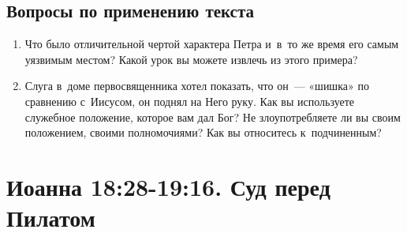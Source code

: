 \documentclass[a4paper,12pt]{article}
\begin{document}
\subsection*{Вопросы по применению текста} 
\begin{enumerate}
    \item Что было отличительной чертой характера Петра и~в~то же время его самым уязвимым местом? Какой урок вы можете извлечь из этого примера?
    
    \myline
    
    \myline
    \item Слуга в~доме первосвященника хотел показать, что он~--- «шишка» по сравнению с~Иисусом, он поднял на Него руку. Как вы используете служебное положение, которое вам дал Бог? Не злоупотребляете ли вы своим положением, своими полномочиями? Как вы относитесь к~подчиненным?
    
    \myline
    
    \myline
\end{enumerate}



\section{Иоанна 18:28-19:16. Суд перед Пилатом}
\end{document}
